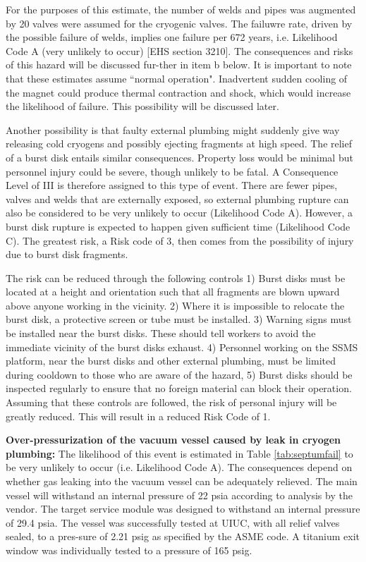 For the purposes of this estimate, the number of welds and pipes was augmented by 20%
valves were assumed for the cryogenic valves.  The failuwre rate, driven by the possible failure of welds, 
implies one failure per 672 years, i.e. Likelihood Code A (very unlikely to occur) [EHS section 3210].  The consequences 
and risks of this hazard will be discussed fur-ther in item b below.  It is important to note that these 
estimates assume ``normal operation".  Inadvertent sudden cooling of the magnet could produce thermal 
contraction and shock, which would increase the likelihood of failure.  This possibility will be discussed 
later.

Another possibility is that faulty external plumbing might suddenly give way releasing cold cryogens and 
possibly ejecting fragments at high speed.  The relief of a burst disk entails similar consequences.  
Property loss would be minimal but personnel injury could be severe, though unlikely to be fatal.  A 
Consequence Level of III is therefore assigned to this type of event.  There are fewer pipes, valves 
and welds that are externally exposed, so external plumbing rupture can also be considered to be very 
unlikely to occur (Likelihood Code A).  However, a burst disk rupture is expected to happen given 
sufficient time (Likelihood Code C).  The greatest risk, a Risk code of 3, then comes from the possibility 
of injury due to burst disk fragments.

The risk can be reduced through the following controls 1) Burst disks must be located at a height and 
orientation such that all fragments are blown upward above anyone working in the vicinity. 2) Where 
it is impossible to relocate the burst disk, a protective screen or tube must be installed.  3) Warning 
signs must be installed near the burst disks.  These should tell workers to avoid the immediate vicinity 
of the burst disks exhaust.  4) Personnel working on the SSMS platform, near the burst disks and other 
external plumbing, must be limited during cooldown to those who are aware of the hazard,
  5) Burst disks should be inspected regularly to 
ensure that no foreign material can block their operation. Assuming that these controls are followed, 
the risk of personal injury will be greatly reduced.  This will result in a reduced Risk Code of 1.

{\bf Over-pressurization of the vacuum vessel caused by leak in cryogen plumbing:} The likelihood 
of this event is estimated in Table \ref{tab:septumfail} to be very unlikely to occur (i.e. Likelihood Code A).  The 
consequences depend on whether gas leaking into the vacuum vessel can be adequately relieved.  The 
main vessel will withstand an internal pressure of 22 psia according to analysis by the vendor. The 
target service module was designed to withstand an internal pressure of 29.4 psia.  The vessel was 
successfully tested at UIUC, with all relief valves sealed, to a pres-sure of 2.21 psig as specified by 
the ASME code.  A titanium exit window was individually tested to a pressure of 165 psig.

